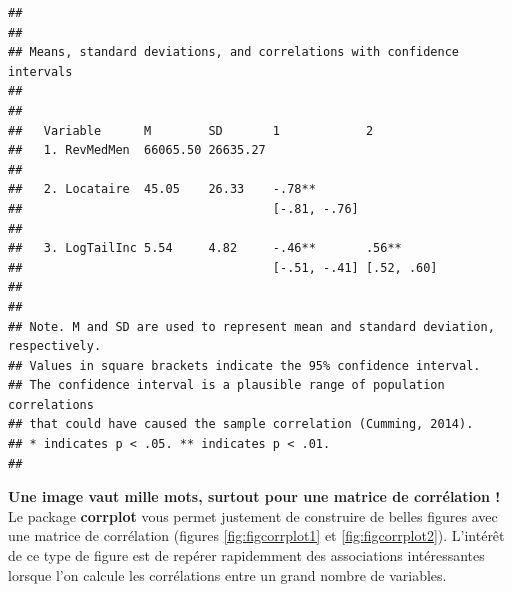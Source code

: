 \documentclass[
  11pt,
  french,
]{book}
\makeatletter
\newenvironment{kframev}{%
\medskip{}
\setlength{\fboxsep}{.8em}
 \def\at@end@of@kframev{}%
 \ifinner\ifhmode%
  \def\at@end@of@kframev{\end{minipage}}%
  \begin{minipage}{\columnwidth}%
 \fi\fi%
 \def\FrameCommand##1{\hskip\@totalleftmargin \hskip-\fboxsep
 \colorbox{shadebluecolor}{##1}\hskip-\fboxsep
     \hskip-\linewidth \hskip-\@totalleftmargin \hskip\columnwidth}%
 \MakeFramed {\advance\hsize-\width
   \@totalleftmargin\z@ \linewidth\hsize
   \@setminipage}}%
 {\par\unskip\endMakeFramed%
 \at@end@of@kframev}
\newenvironment{rmdblock}[1]
  {
  \begin{itemize}
  \renewcommand{\labelitemi}{
    \raisebox{-.7\height}[0pt][0pt]{
      {\setkeys{Gin}{width=3em,keepaspectratio}\texttt{[image: images/\#1]}}
    }
  }
  \setlength{\fboxsep}{1em}
  \begin{kframev}
  \small
  \item
  }
  {
  \end{kframev}
  \end{itemize}
  }
\newenvironment{bloc_astuce}
  {\begin{rmdblock}{astuce}}
  {\end{rmdblock}}
\makeatother
\begin{document}
\begin{verbatim}
## 
## 
## Means, standard deviations, and correlations with confidence intervals
##  
## 
##   Variable      M        SD       1            2         
##   1. RevMedMen  66065.50 26635.27                        
##                                                          
##   2. Locataire  45.05    26.33    -.78**                 
##                                   [-.81, -.76]           
##                                                          
##   3. LogTailInc 5.54     4.82     -.46**       .56**     
##                                   [-.51, -.41] [.52, .60]
##                                                          
## 
## Note. M and SD are used to represent mean and standard deviation, respectively.
## Values in square brackets indicate the 95% confidence interval.
## The confidence interval is a plausible range of population correlations 
## that could have caused the sample correlation (Cumming, 2014).
## * indicates p < .05. ** indicates p < .01.
## 
\end{verbatim}

\begin{bloc_astuce}

\textbf{Une image vaut mille mots, surtout pour une matrice de corrélation !} Le package \textbf{corrplot} vous permet justement de construire de belles figures avec une matrice de corrélation (figures \ref{fig:figcorrplot1} et \ref{fig:figcorrplot2}). L'intérêt de ce type de figure est de repérer rapidemment des associations intéressantes lorsque l'on calcule les corrélations entre un grand nombre de variables.

\end{bloc_astuce}
\end{document}
